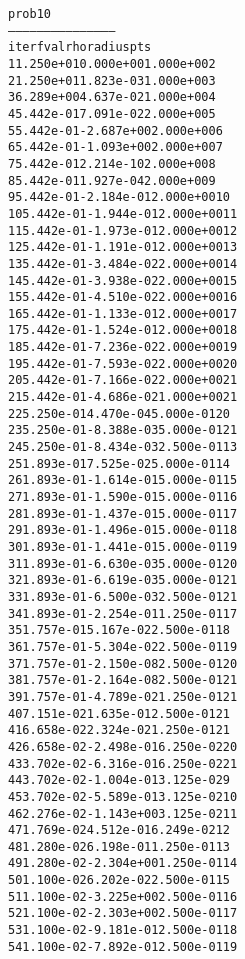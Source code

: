 \begin{alltt}
prob10
---------------------------------------------
iter        fval         rho      radius  pts
   1   1.250e+01   0.000e+00   1.000e+00    2
   2   1.250e+01   1.823e-03   1.000e+00    3
   3   6.289e+00   4.637e-02   1.000e+00    4
   4   5.442e-01   7.091e-02   2.000e+00    5
   5   5.442e-01  -2.687e+00   2.000e+00    6
   6   5.442e-01  -1.093e+00   2.000e+00    7
   7   5.442e-01   2.214e-10   2.000e+00    8
   8   5.442e-01   1.927e-04   2.000e+00    9
   9   5.442e-01  -2.184e-01   2.000e+00   10
  10   5.442e-01  -1.944e-01   2.000e+00   11
  11   5.442e-01  -1.973e-01   2.000e+00   12
  12   5.442e-01  -1.191e-01   2.000e+00   13
  13   5.442e-01  -3.484e-02   2.000e+00   14
  14   5.442e-01  -3.938e-02   2.000e+00   15
  15   5.442e-01  -4.510e-02   2.000e+00   16
  16   5.442e-01  -1.133e-01   2.000e+00   17
  17   5.442e-01  -1.524e-01   2.000e+00   18
  18   5.442e-01  -7.236e-02   2.000e+00   19
  19   5.442e-01  -7.593e-02   2.000e+00   20
  20   5.442e-01  -7.166e-02   2.000e+00   21
  21   5.442e-01  -4.686e-02   1.000e+00   21
  22   5.250e-01   4.470e-04   5.000e-01   20
  23   5.250e-01  -8.388e-03   5.000e-01   21
  24   5.250e-01  -8.434e-03   2.500e-01   13
  25   1.893e-01   7.525e-02   5.000e-01   14
  26   1.893e-01  -1.614e-01   5.000e-01   15
  27   1.893e-01  -1.590e-01   5.000e-01   16
  28   1.893e-01  -1.437e-01   5.000e-01   17
  29   1.893e-01  -1.496e-01   5.000e-01   18
  30   1.893e-01  -1.441e-01   5.000e-01   19
  31   1.893e-01  -6.630e-03   5.000e-01   20
  32   1.893e-01  -6.619e-03   5.000e-01   21
  33   1.893e-01  -6.500e-03   2.500e-01   21
  34   1.893e-01  -2.254e-01   1.250e-01   17
  35   1.757e-01   5.167e-02   2.500e-01   18
  36   1.757e-01  -5.304e-02   2.500e-01   19
  37   1.757e-01  -2.150e-08   2.500e-01   20
  38   1.757e-01  -2.164e-08   2.500e-01   21
  39   1.757e-01  -4.789e-02   1.250e-01   21
  40   7.151e-02   1.635e-01   2.500e-01   21
  41   6.658e-02   2.324e-02   1.250e-01   21
  42   6.658e-02  -2.498e-01   6.250e-02   20
  43   3.702e-02  -6.316e-01   6.250e-02   21
  44   3.702e-02  -1.004e-01   3.125e-02    9
  45   3.702e-02  -5.589e-01   3.125e-02   10
  46   2.276e-02  -1.143e+00   3.125e-02   11
  47   1.769e-02   4.512e-01   6.249e-02   12
  48   1.280e-02   6.198e-01   1.250e-01   13
  49   1.280e-02  -2.304e+00   1.250e-01   14
  50   1.100e-02   6.202e-02   2.500e-01   15
  51   1.100e-02  -3.225e+00   2.500e-01   16
  52   1.100e-02  -2.303e+00   2.500e-01   17
  53   1.100e-02  -9.181e-01   2.500e-01   18
  54   1.100e-02  -7.892e-01   2.500e-01   19

\end{alltt}
